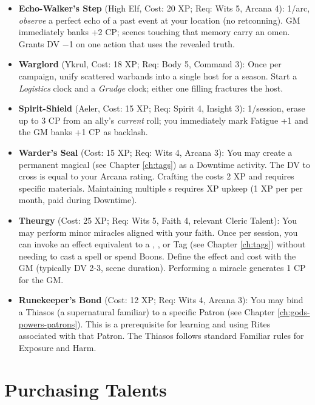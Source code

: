 \begin{itemize}
    \item \textbf{Echo-Walker's Step} (High Elf, Cost: 20 XP; Req: Wits 5, Arcana 4): 
1/arc, \emph{observe} a perfect echo of a past event at your location (no retconning). 
GM immediately banks +2 CP; scenes touching that memory carry an omen. Grants DV −1 on one action that uses the revealed truth.
    \item \textbf{Warglord} (Ykrul, Cost: 18 XP; Req: Body 5, Command 3): 
Once per campaign, unify scattered warbands into a single host for a season. Start a \emph{Logistics} clock and a \emph{Grudge} clock; either one filling fractures the host.
    \item \textbf{Spirit-Shield} (Aeler, Cost: 15 XP; Req: Spirit 4, Insight 3): 
1/session, erase up to 3 CP from an ally's \emph{current} roll; you immediately mark Fatigue +1 and the GM banks +1 CP as backlash.
    \item \textbf{Warder's Seal} (Cost: 15 XP; Req: Wits 4, Arcana 3): You may create a permanent magical  (see Chapter \ref{ch:tags}) as a Downtime activity. The DV to cross is equal to your Arcana rating. Crafting the  costs 2 XP and requires specific materials. Maintaining multiple s requires XP upkeep (1 XP per  per month, paid during Downtime).
    \item \textbf{Theurgy} (Cost: 25 XP; Req: Wits 5, Faith 4, relevant Cleric Talent): You may perform minor miracles aligned with your faith. Once per session, you can invoke an effect equivalent to a , , or  Tag (see Chapter \ref{ch:tags}) without needing to cast a spell or spend Boons. Define the effect and cost with the GM (typically DV 2-3, scene duration). Performing a miracle generates 1 CP for the GM.
    \item \textbf{Runekeeper's Bond} (Cost: 12 XP; Req: Wits 4, Arcana 3): You may bind a Thiasos (a supernatural familiar) to a specific Patron (see Chapter \ref{ch:gods-powers-patrons}). This is a prerequisite for learning and using Rites associated with that Patron. The Thiasos follows standard Familiar rules for Exposure and Harm.
\end{itemize}

\section{Purchasing Talents}


